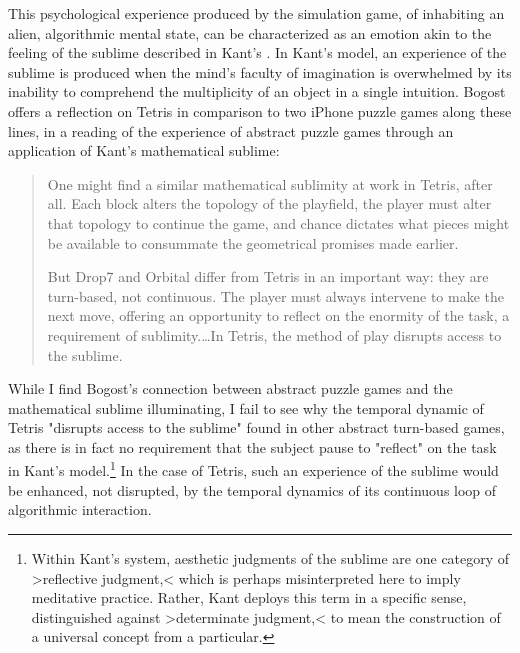 This psychological experience produced by the simulation game, of inhabiting an alien, algorithmic mental state, can be characterized as an emotion akin to the feeling of the sublime described in Kant's . In Kant's model, an experience of the sublime is produced when the mind's faculty of imagination is overwhelmed by its inability to comprehend the multiplicity of an object in a single intuition. Bogost offers a reflection on Tetris in comparison to two iPhone puzzle games along these lines, in a reading of the experience of abstract puzzle games through an application of Kant's mathematical sublime:

\blockquote{
  One might find a similar mathematical sublimity at work in Tetris, after all. Each block alters the topology of the playfield, the player must alter that topology to continue the game, and chance dictates what pieces might be available to consummate the geometrical promises made earlier.
  
  But Drop7 and Orbital differ from Tetris in an important way: they are turn-based, not continuous. The player must always intervene to make the next move, offering an opportunity to reflect on the enormity of the task, a requirement of sublimity.…In Tetris, the method of play disrupts access to the sublime. \autocite*{Bogost2009-gj}
  }
While I find Bogost's connection between abstract puzzle games and the mathematical sublime illuminating, I fail to see why the temporal dynamic of Tetris "disrupts access to the sublime" found in other abstract turn-based games, as there is in fact no requirement that the subject pause to "reflect" on the task in Kant's model.\footnote{
  Within Kant's system, aesthetic judgments of the sublime are one category of >reflective judgment,< which is perhaps misinterpreted here to imply meditative practice. Rather, Kant deploys this term in a specific sense, distinguished against >determinate judgment,< to mean the construction of a universal concept from a particular.
}
In the case of Tetris, such an experience of the sublime would be enhanced, not disrupted, by the temporal dynamics of its continuous loop of algorithmic interaction.

